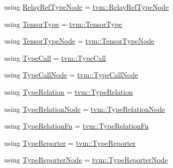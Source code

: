 \begin{DoxyCompactItemize}
\item 
using \hyperlink{namespacetvm_1_1relay_ae665239bd9119c8afb037d47781bf237}{Relay\+Ref\+Type\+Node} = \hyperlink{classtvm_1_1RelayRefTypeNode}{tvm\+::\+Relay\+Ref\+Type\+Node}
\item 
using \hyperlink{namespacetvm_1_1relay_a52c13723bba53f4953dfd10c34d480f8}{Tensor\+Type} = \hyperlink{classtvm_1_1TensorType}{tvm\+::\+Tensor\+Type}
\item 
using \hyperlink{namespacetvm_1_1relay_acfeff91bc774a278a2e9f6103a04387d}{Tensor\+Type\+Node} = \hyperlink{classtvm_1_1TensorTypeNode}{tvm\+::\+Tensor\+Type\+Node}
\item 
using \hyperlink{namespacetvm_1_1relay_ab406a37acee11226e3e2e119beee439e}{Type\+Call} = \hyperlink{classtvm_1_1TypeCall}{tvm\+::\+Type\+Call}
\item 
using \hyperlink{namespacetvm_1_1relay_af4dccabc877b8fd7db47cb73fb93883e}{Type\+Call\+Node} = \hyperlink{classtvm_1_1TypeCallNode}{tvm\+::\+Type\+Call\+Node}
\item 
using \hyperlink{namespacetvm_1_1relay_adab0d56fd993df71df3068dea0cd5456}{Type\+Relation} = \hyperlink{classtvm_1_1TypeRelation}{tvm\+::\+Type\+Relation}
\item 
using \hyperlink{namespacetvm_1_1relay_a89d812eaf13520b04e89a9414c51748c}{Type\+Relation\+Node} = \hyperlink{classtvm_1_1TypeRelationNode}{tvm\+::\+Type\+Relation\+Node}
\item 
using \hyperlink{namespacetvm_1_1relay_af253112249297a6cfb2a9b94cde0f235}{Type\+Relation\+Fn} = \hyperlink{namespacetvm_a72dcba4493adfcd8908663898ece3514}{tvm\+::\+Type\+Relation\+Fn}
\item 
using \hyperlink{namespacetvm_1_1relay_afa9be9990c2006832cbfc02ebb35e527}{Type\+Reporter} = \hyperlink{classtvm_1_1TypeReporter}{tvm\+::\+Type\+Reporter}
\item 
using \hyperlink{namespacetvm_1_1relay_aaa3b5700ea20db399f539cec1abcb12b}{Type\+Reporter\+Node} = \hyperlink{classtvm_1_1TypeReporterNode}{tvm\+::\+Type\+Reporter\+Node}
\end{DoxyCompactItemize}
